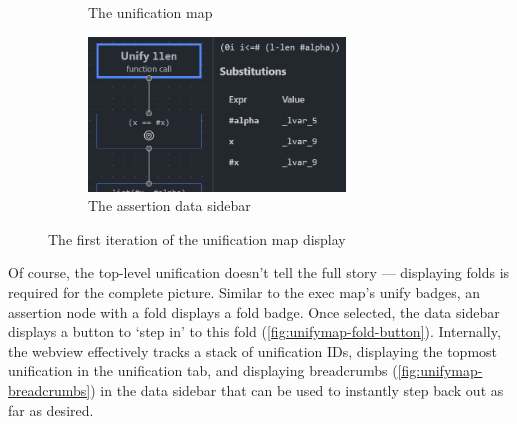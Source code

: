 \begin{figure}
\begin{subfigure}[b]{0.3\textwidth}
    \caption{The unification map}%
    \label{fig:unifymap-init}
  \end{subfigure}
  \qquad
  \begin{subfigure}[b]{0.5\textwidth}
    \centering
    \includegraphics[width=0.75\textwidth]{img/unifymap-sidebar.png}
    \caption{The assertion data sidebar}%
    \label{fig:unifymap-sidebar}
  \end{subfigure}
  \caption{The first iteration of the unification map display}
\end{figure}

Of course, the top-level unification doesn't tell the full story --- displaying
folds is required for the complete picture. Similar to the exec map's unify
badges, an assertion node with a fold displays a fold badge. Once selected,
the data sidebar displays a button to `step in' to this fold
(\autoref{fig:unifymap-fold-button}). Internally, the webview effectively tracks
a stack of unification IDs, displaying the topmost unification in the
unification tab, and displaying breadcrumbs (\autoref{fig:unifymap-breadcrumbs})
in the data sidebar that can be used to instantly step back out as far as
desired.

